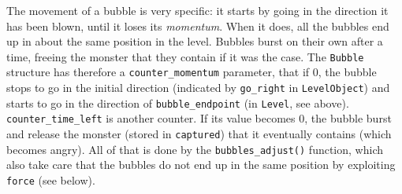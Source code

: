 \documentclass[12pt,a4paper]{article}
\newcommand{\cc}[1]{\texttt{#1}}
\begin{document}
The movement of a bubble is very specific: it starts by going in the direction it has been blown, until it loses its \textit{momentum}. When it does, all the bubbles end up in about the same position in the level. Bubbles burst on their own after a time, freeing the monster that they contain if it was the case. The \cc{Bubble} structure has therefore a \cc{counter_momentum} parameter, that if 0, the bubble stops to go in the initial direction (indicated by \cc{go_right} in \cc{LevelObject}) and starts to go in the direction of \cc{bubble_endpoint} (in \cc{Level}, see above). \cc{counter_time_left} is another counter. If its value becomes 0, the bubble burst and release the monster (stored in \cc{captured}) that it eventually contains (which becomes angry). All of that is done by the \cc{bubbles_adjust()} function, which also take care that the bubbles do not end up in the same position by exploiting \cc{force} (see below).
\end{document}

